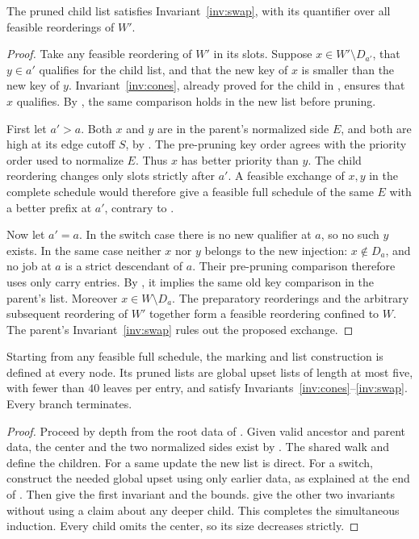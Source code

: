 \begin{lemma}\label{lem:swap}
The pruned child list satisfies Invariant~\ref{inv:swap},
with its quantifier over all feasible reorderings of \(W'\).
\end{lemma}
\begin{proof}
Take any feasible reordering of \(W'\) in its slots.
Suppose \(x\in W'\setminus D_{a'}\), that \(y\in a'\)
qualifies for the child list, and that the new key of \(x\)
is smaller than the new key of \(y\).
Invariant~\ref{inv:cones}, already proved for the child in
, ensures that \(x\) qualifies.
By , the same comparison holds in the new list
before pruning.

First let \(a'>a\). Both \(x\) and \(y\) are in the parent's
normalized side \(E\), and both are high at its edge cutoff \(S\),
by . The pre-pruning key order agrees with
the priority order used to normalize \(E\). Thus \(x\) has
better priority than \(y\).
The child reordering changes only slots strictly after \(a'\).
A feasible exchange of \(x,y\) in the complete schedule would
therefore give a feasible full schedule of the same \(E\)
with a better prefix at \(a'\), contrary to
.

Now let \(a'=a\).
In the switch case there is no new qualifier at \(a\), so no
such \(y\) exists.
In the same case neither \(x\) nor \(y\) belongs to the new
injection: \(x\notin D_a\), and no job at \(a\) is a strict
descendant of \(a\).
Their pre-pruning comparison therefore uses only carry entries.
By , it implies the same old key comparison
in the parent's list.
Moreover \(x\in W\setminus D_a\).
The preparatory reorderings and the arbitrary subsequent reordering
of \(W'\) together form a feasible reordering confined to \(W\).
The parent's Invariant~\ref{inv:swap} rules out the proposed
exchange.
\end{proof}

\begin{proposition}\label{prop:construction-valid}
Starting from any feasible full schedule, the marking and list
construction is defined at every node. Its pruned lists are global
upset lists of length at most five, with fewer than \(40\) leaves
per entry, and satisfy Invariants~\ref{inv:cones}--\ref{inv:swap}.
Every branch terminates.
\end{proposition}
\begin{proof}
Proceed by depth from the root data of .
Given valid ancestor and parent data, the center and the two
normalized sides exist by .
The shared walk and  define the children.
For a same update the new list is direct. For a switch,
 construct the needed global upset
using only earlier data, as explained at the end of
.
Then 
give the first invariant and the bounds.
 give the other two invariants without
using a claim about any deeper child.
This completes the simultaneous induction.
Every child omits the center, so its size decreases strictly.
\end{proof}

